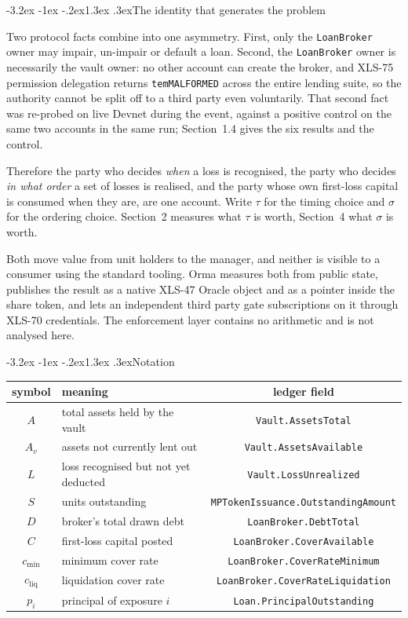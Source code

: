\documentclass[11pt]{article}
\makeatletter
\renewcommand\subsection{\@startsection{subsection}{2}{\z@}%
  {-3.2ex \@plus -1ex \@minus -.2ex}{1.3ex \@plus .3ex}{\normalfont\large\bfseries}}
\theoremstyle{orma}
\theoremstyle{ormaupright}
\makeatother
\begin{document}
\subsection{The identity that generates the problem}

Two protocol facts combine into one asymmetry. First, only the \texttt{LoanBroker} owner may
impair, un-impair or default a loan. Second, the \texttt{LoanBroker} owner is necessarily
the vault owner: no other account can create the broker, and XLS-75 permission delegation
returns \texttt{temMALFORMED} across the entire lending suite, so the authority cannot be
split off to a third party even voluntarily. That second fact was re-probed on live Devnet
during the event, against a positive control on the same two accounts in the same run;
Section~1.4 gives the six results and the control.

Therefore the party who decides \emph{when} a loss is recognised, the party who decides
\emph{in what order} a set of losses is realised, and the party whose own first-loss capital
is consumed when they are, are one account. Write $\tau$ for the timing choice and $\sigma$
for the ordering choice. Section~2 measures what $\tau$ is worth, Section~4 what $\sigma$ is
worth.

Both move value from unit holders to the manager, and neither is visible to a
consumer using the standard tooling. Orma measures both from public state, publishes the
result as a native XLS-47 Oracle object and as a pointer inside the share token, and lets an
independent third party gate subscriptions on it through XLS-70 credentials. The enforcement
layer contains no arithmetic and is not analysed here.

\subsection{Notation}

\begin{center}
\setlength{\tabcolsep}{7pt}
\begin{tabular}{clc}
\toprule
symbol & meaning & ledger field \\
\midrule
$A$ & total assets held by the vault & \texttt{Vault.AssetsTotal} \\
$A_v$ & assets not currently lent out & \texttt{Vault.AssetsAvailable} \\
$L$ & loss recognised but not yet deducted & \texttt{Vault.LossUnrealized} \\
$S$ & units outstanding & \texttt{MPTokenIssuance.OutstandingAmount} \\
$D$ & broker's total drawn debt & \texttt{LoanBroker.DebtTotal} \\
$C$ & first-loss capital posted & \texttt{LoanBroker.CoverAvailable} \\
$c_{\min}$ & minimum cover rate & \texttt{LoanBroker.CoverRateMinimum} \\
$c_{\mathrm{liq}}$ & liquidation cover rate & \texttt{LoanBroker.CoverRateLiquidation} \\
$p_i$ & principal of exposure $i$ & \texttt{Loan.PrincipalOutstanding} \\
\bottomrule
\end{tabular}
\end{center}
\end{document}
